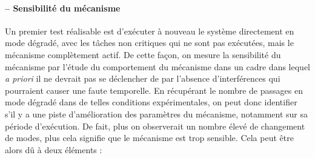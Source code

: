 \documentclass[french, a4paper, 11pt, twoside, pdftex]{StyleThese}
\begin{document}
    	\paragraph{ -- Sensibilité du mécanisme}
    	Un premier test réalisable est d'exécuter à nouveau le système directement en mode dégradé, avec les tâches non critiques qui ne sont pas exécutées, mais le mécanisme complètement actif.
    	De cette façon, on mesure la sensibilité du mécanisme par l'étude du comportement du mécanisme dans un cadre dans lequel \textit{a priori} il ne devrait pas se déclencher de par l'absence d'interférences qui pourraient causer une faute temporelle.
    	En récupérant le nombre de passages en mode dégradé dans de telles conditions expérimentales, on peut donc identifier s'il y a une piste d'amélioration des paramètres du mécanisme, notamment sur sa période d'exécution. De fait, plus on observerait un nombre élevé de changement de modes, plus cela signifie que le mécanisme est trop sensible. Cela peut être alors dû à deux éléments : 
\end{document}
